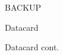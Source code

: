 \appendix
{}
\setcounter{finalframe}{\value{framenumber}}
\begin{frame}
 \huge BACKUP
\end{frame}

\begin{frame}{Datacard}

\end{frame}
\begin{frame}{Datacard cont.}
\end{frame}



\setcounter{framenumber}{\value{finalframe}}
